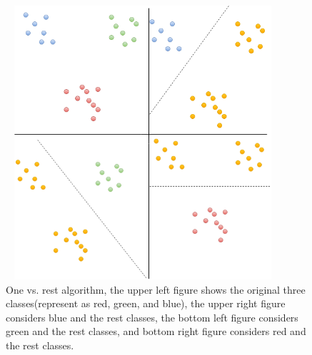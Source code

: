 \begin{figure} [hp]
	\begin{center}
		\includegraphics[width=4in,  height=4in]{figures/onevsrest.png}
	\end{center}
	\caption{One vs. rest algorithm, the upper left figure shows the original three classes(represent as red,  green,  and blue), the upper right figure considers blue and the rest classes, the bottom left figure considers green and the rest classes,  and bottom right figure considers red and the rest classes. } \label{fig:onevsrest}
\end{figure}


